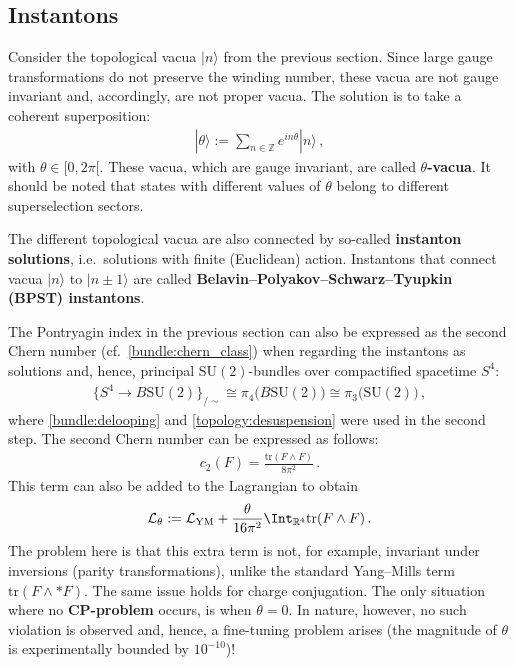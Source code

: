\subsection{Instantons}

    Consider the topological vacua $|n\rangle$  from the previous section. Since large gauge transformations do not preserve the winding number, these vacua are not gauge invariant and, accordingly, are not proper vacua. The solution is to take a coherent superposition:
    \begin{gather}
        |\theta\rangle := \sum_{n\in\mathbb{Z}}e^{in\theta}|n\rangle\,,
    \end{gather}
    with $\theta\in[0,2\pi[$. These vacua, which are gauge invariant, are called \textbf{$\theta$-vacua}. It should be noted that states with different values of $\theta$ belong to different superselection sectors.
    
    The different topological vacua are also connected by so-called \textbf{instanton solutions}, i.e.~solutions with finite (Euclidean) action. Instantons that connect vacua $|n\rangle$ to $|n\pm1\rangle$ are called \textbf{Belavin--Polyakov--Schwarz--Tyupkin (BPST) instantons}.

    The Pontryagin index in the previous section can also be expressed as the second Chern number (cf.~\cref{bundle:chern_class}) when regarding the instantons as solutions and, hence, principal $\mathrm{SU}(2)$-bundles over compactified spacetime $S^4$:
    \begin{gather}
        \{S^4\rightarrow B\mathrm{SU}(2)\}_{/\sim} \cong \pi_4\bigl(B\mathrm{SU}(2)\bigr)\cong\pi_3\bigl(\mathrm{SU}(2)\bigr)\,,
    \end{gather}
    where \cref{bundle:delooping} and \cref{topology:desuspension} were used in the second step. The second Chern number can be expressed as follows:
    \begin{gather}
        c_2(F) = \frac{\mathrm{tr}(F\wedge F)}{8\pi^2}\,.
    \end{gather}
    This term can also be added to the Lagrangian to obtain
    \begin{gather}
        \mathcal{L}_\theta := \mathcal{L}_{\text{YM}} + \frac{\theta}{16\pi^2}\Int_{\mathbb{R}^4}\mathrm{tr}(F\wedge F)\,.
    \end{gather}
    The problem here is that this extra term is not, for example, invariant under inversions (parity transformations), unlike the standard Yang--Mills term $\mathrm{tr}(F\wedge\ast F)$. The same issue holds for charge conjugation. The only situation where no \textbf{CP-problem} occurs, is when $\theta=0$. In nature, however, no such violation is observed and, hence, a fine-tuning problem arises (the magnitude of $\theta$ is experimentally bounded by $10^{-10}$)!

